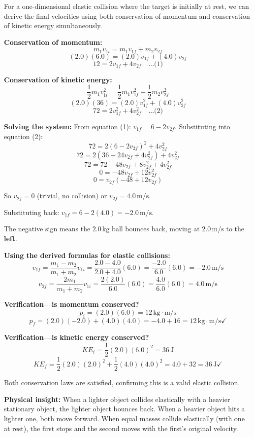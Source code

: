 \documentclass[12pt,letterpaper]{article}
\begin{document}
\begin{explanationbox}
For a one-dimensional elastic collision where the target is initially at rest, we can derive the final velocities using both conservation of momentum and conservation of kinetic energy simultaneously.

\textbf{Conservation of momentum:}
\[
m_1 v_{1i} = m_1 v_{1f} + m_2 v_{2f}
\]
\[
(2.0)(6.0) = (2.0)v_{1f} + (4.0)v_{2f}
\]
\[
12 = 2v_{1f} + 4v_{2f} \quad \text{...(1)}
\]

\textbf{Conservation of kinetic energy:}
\[
\frac{1}{2}m_1 v_{1i}^2 = \frac{1}{2}m_1 v_{1f}^2 + \frac{1}{2}m_2 v_{2f}^2
\]
\[
(2.0)(36) = (2.0)v_{1f}^2 + (4.0)v_{2f}^2
\]
\[
72 = 2v_{1f}^2 + 4v_{2f}^2 \quad \text{...(2)}
\]

\textbf{Solving the system:} From equation (1): $v_{1f} = 6 - 2v_{2f}$. Substituting into equation (2):
\[
72 = 2(6 - 2v_{2f})^2 + 4v_{2f}^2
\]
\[
72 = 2(36 - 24v_{2f} + 4v_{2f}^2) + 4v_{2f}^2
\]
\[
72 = 72 - 48v_{2f} + 8v_{2f}^2 + 4v_{2f}^2
\]
\[
0 = -48v_{2f} + 12v_{2f}^2
\]
\[
0 = v_{2f}(-48 + 12v_{2f})
\]

So $v_{2f} = 0$ (trivial, no collision) or $v_{2f} = 4.0\,\text{m/s}$.

Substituting back: $v_{1f} = 6 - 2(4.0) = -2.0\,\text{m/s}$.

The negative sign means the $2.0\,\text{kg}$ ball bounces back, moving at $2.0\,\text{m/s}$ to the \textbf{left}.

\textbf{Using the derived formulas for elastic collisions:}
\[
v_{1f} = \frac{m_1 - m_2}{m_1 + m_2}v_{1i} = \frac{2.0 - 4.0}{2.0 + 4.0}(6.0) = \frac{-2.0}{6.0}(6.0) = -2.0\,\text{m/s}
\]
\[
v_{2f} = \frac{2m_1}{m_1 + m_2}v_{1i} = \frac{2(2.0)}{6.0}(6.0) = \frac{4.0}{6.0}(6.0) = 4.0\,\text{m/s}
\]

\textbf{Verification---is momentum conserved?}
\[
p_i = (2.0)(6.0) = 12\,\text{kg}\cdot\text{m/s}
\]
\[
p_f = (2.0)(-2.0) + (4.0)(4.0) = -4.0 + 16 = 12\,\text{kg}\cdot\text{m/s} \checkmark
\]

\textbf{Verification---is kinetic energy conserved?}
\[
KE_i = \frac{1}{2}(2.0)(6.0)^2 = 36\,\text{J}
\]
\[
KE_f = \frac{1}{2}(2.0)(2.0)^2 + \frac{1}{2}(4.0)(4.0)^2 = 4.0 + 32 = 36\,\text{J} \checkmark
\]

Both conservation laws are satisfied, confirming this is a valid elastic collision.

\textbf{Physical insight:} When a lighter object collides elastically with a heavier stationary object, the lighter object bounces back. When a heavier object hits a lighter one, both move forward. When equal masses collide elastically (with one at rest), the first stops and the second moves with the first's original velocity.
\end{explanationbox}
\end{document}
